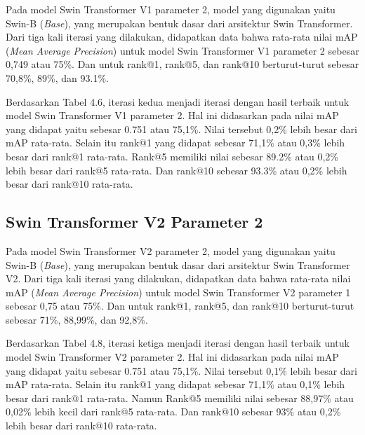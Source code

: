 Pada model Swin Transformer V1 parameter 2, model yang digunakan yaitu Swin-B (\emph{Base}), yang merupakan bentuk 
dasar dari arsitektur Swin Transformer. Dari tiga kali iterasi yang dilakukan, didapatkan data bahwa rata-rata nilai 
mAP (\emph{Mean Average Precision}) untuk model Swin Transformer V1 parameter 2 sebesar 0,749 atau 75\%. Dan untuk 
rank@1, rank@5, dan rank@10 berturut-turut sebesar 70,8\%, 89\%, dan 93.1\%. 

Berdasarkan Tabel 4.6, iterasi kedua menjadi iterasi dengan hasil terbaik untuk model Swin Transformer V1 parameter 2. 
Hal ini didasarkan pada nilai mAP yang didapat yaitu sebesar 0.751 atau 75,1\%. Nilai tersebut 0,2\% lebih besar dari 
mAP rata-rata. Selain itu rank@1 yang didapat sebesar 71,1\% atau 0,3\% lebih besar dari rank@1 rata-rata. Rank@5 
memiliki nilai sebesar 89.2\% atau 0,2\% lebih besar dari rank@5 rata-rata. Dan rank@10 sebesar 93.3\% atau 0,2\% 
lebih besar dari rank@10 rata-rata.

\subsection{Swin Transformer V2 Parameter 2}

Pada model Swin Transformer V2 parameter 2, model yang digunakan yaitu Swin-B (\emph{Base}), yang merupakan bentuk 
dasar dari arsitektur Swin Transformer V2. Dari tiga kali iterasi yang dilakukan, didapatkan data bahwa rata-rata nilai 
mAP (\emph{Mean Average Precision}) untuk model Swin Transformer V2 parameter 1 sebesar 0,75 atau 75\%. Dan untuk 
rank@1, rank@5, dan rank@10 berturut-turut sebesar 71\%, 88,99\%, dan 92,8\%. 

Berdasarkan Tabel 4.8, iterasi ketiga menjadi iterasi dengan hasil terbaik untuk model Swin Transformer V2 parameter 2. 
Hal ini didasarkan pada nilai mAP yang didapat yaitu sebesar 0.751 atau 75,1\%. Nilai tersebut 0,1\% lebih besar dari 
mAP rata-rata. Selain itu rank@1 yang didapat sebesar 71,1\% atau 0,1\% lebih besar dari rank@1 rata-rata. Namun 
Rank@5 memiliki nilai sebesar 88,97\% atau 0,02\% lebih kecil dari rank@5 rata-rata. Dan rank@10 sebesar 93\% atau 0,2\% 
lebih besar dari rank@10 rata-rata.

